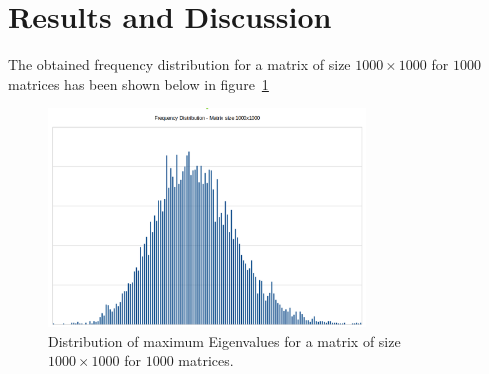 \documentclass[11pt, oneside]{article}
\begin{document}
	
\section{Results and Discussion}
The obtained frequency distribution for a matrix of size $1000 \times 1000$ for $1000$ matrices has been shown below in figure~\ref{fig:dist}
 \begin{figure}[h]
		\centering
		\includegraphics[width=0.75\textwidth]{Figures/n1000.png}
		\caption{Distribution of maximum Eigenvalues for a matrix of size $1000 \times 1000$ for $1000$ matrices.}
		\label{fig:dist}
	\end{figure}
\end{document}

